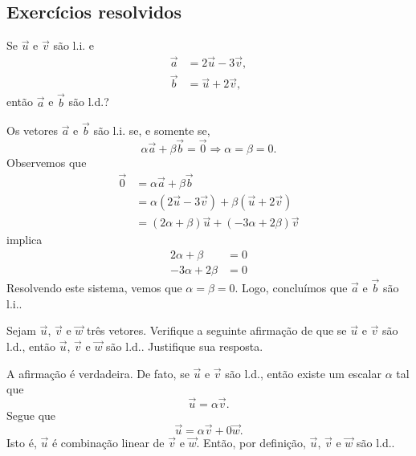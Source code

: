 \subsection*{Exercícios resolvidos}

\begin{exeresol}
  Se $\vec{u}$ e $\vec{v}$ são l.i. e
  \begin{align}
    \vec{a} &= 2\vec{u} - 3\vec{v},\\
    \vec{b} &= \vec{u} + 2\vec{v},
  \end{align}
  então $\vec{a}$ e $\vec{b}$ são l.d.?
\end{exeresol}
\begin{resol}
  Os vetores $\vec{a}$ e $\vec{b}$ são l.i. se, e somente se,
  \begin{equation}
    \alpha\vec{a} + \beta\vec{b} = \vec{0} \Rightarrow \alpha=\beta=0.
  \end{equation}
  Observemos que
  \begin{align}
    \vec{0} &= \alpha\vec{a}+\beta\vec{b}\\
            &= \alpha(2\vec{u} - 3\vec{v}) + \beta(\vec{u}+2\vec{v})\\
            &= (2\alpha+\beta)\vec{u} + (-3\alpha+2\beta)\vec{v}
  \end{align}
  implica
  \begin{align}
    2\alpha + \beta &= 0 \\
    -3\alpha + 2\beta &= 0
  \end{align}
  Resolvendo este sistema, vemos que $\alpha = \beta = 0$. Logo, concluímos que $\vec{a}$ e $\vec{b}$ são l.i.. 
\end{resol}

\begin{exeresol}
  Sejam $\vec{u}$, $\vec{v}$ e $\vec{w}$ três vetores. Verifique a seguinte afirmação de que se $\vec{u}$ e $\vec{v}$ são l.d., então $\vec{u}$, $\vec{v}$ e $\vec{w}$ são l.d.. Justifique sua resposta.
\end{exeresol}
\begin{resol}
  A afirmação é verdadeira. De fato, se $\vec{u}$ e $\vec{v}$ são l.d., então existe um escalar $\alpha$ tal que
  \begin{equation}
    \vec{u} = \alpha\vec{v}.
  \end{equation}
  Segue que
  \begin{equation}
    \vec{u} = \alpha\vec{v} + 0\vec{w}.
  \end{equation}
  Isto é, $\vec{u}$ é combinação linear de $\vec{v}$ e $\vec{w}$. Então, por definição, $\vec{u}$, $\vec{v}$ e $\vec{w}$ são l.d..
\end{resol}

